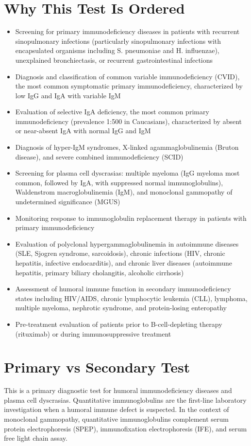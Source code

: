 \section*{Why This Test Is Ordered}
\begin{itemize}
  \item Screening for primary immunodeficiency diseases in patients with recurrent sinopulmonary infections (particularly sinopulmonary infections with encapsulated organisms including S. pneumoniae and H. influenzae), unexplained bronchiectasis, or recurrent gastrointestinal infections \cite{bonilla2015practice}
  \item Diagnosis and classification of common variable immunodeficiency (CVID), the most common symptomatic primary immunodeficiency, characterized by low IgG and IgA with variable IgM
  \item Evaluation of selective IgA deficiency, the most common primary immunodeficiency (prevalence 1:500 in Caucasians), characterized by absent or near-absent IgA with normal IgG and IgM
  \item Diagnosis of hyper-IgM syndromes, X-linked agammaglobulinemia (Bruton disease), and severe combined immunodeficiency (SCID)
  \item Screening for plasma cell dyscrasias: multiple myeloma (IgG myeloma most common, followed by IgA, with suppressed normal immunoglobulins), Waldenstrom macroglobulinemia (IgM), and monoclonal gammopathy of undetermined significance (MGUS) \cite{rajkumar2006monoclonal}
  \item Monitoring response to immunoglobulin replacement therapy in patients with primary immunodeficiency
  \item Evaluation of polyclonal hypergammaglobulinemia in autoimmune diseases (SLE, Sjogren syndrome, sarcoidosis), chronic infections (HIV, chronic hepatitis, infective endocarditis), and chronic liver diseases (autoimmune hepatitis, primary biliary cholangitis, alcoholic cirrhosis)
  \item Assessment of humoral immune function in secondary immunodeficiency states including HIV/AIDS, chronic lymphocytic leukemia (CLL), lymphoma, multiple myeloma, nephrotic syndrome, and protein-losing enteropathy
  \item Pre-treatment evaluation of patients prior to B-cell-depleting therapy (rituximab) or during immunosuppressive treatment
\end{itemize}

\section*{Primary vs Secondary Test}
This is a primary diagnostic test for humoral immunodeficiency diseases and plasma cell dyscrasias. Quantitative immunoglobulins are the first-line laboratory investigation when a humoral immune defect is suspected. In the context of monoclonal gammopathy, quantitative immunoglobulins complement serum protein electrophoresis (SPEP), immunofixation electrophoresis (IFE), and serum free light chain assay.

